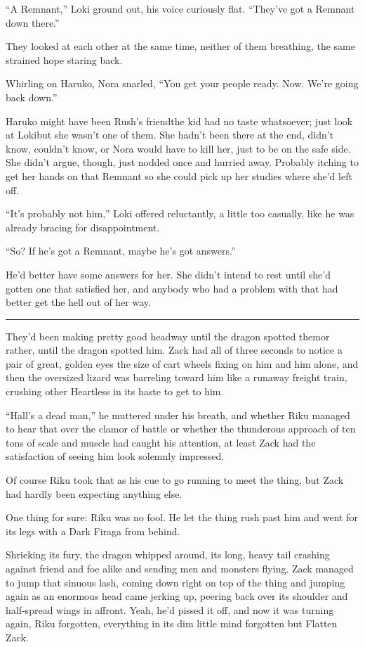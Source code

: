 ``A Remnant,'' Loki ground out, his voice curiously flat. ``They've got a Remnant down there.''

They looked at each other at the same time, neither of them breathing, the same strained hope staring back.

Whirling on Haruko, Nora snarled, ``You get your people ready. Now. We're going back down.''

Haruko might have been Rush's friend\textemdash the kid had no taste whatsoever; just look at Loki\textemdash but she wasn't one of them. She hadn't been there at the end, didn't know, couldn't know, or Nora would have to kill her, just to be on the safe side. She didn't argue, though, just nodded once and hurried away. Probably itching to get her hands on that Remnant so she could pick up her studies where she'd left off.

``It's probably not him,'' Loki offered reluctantly, a little too casually, like he was already bracing for disappointment.

``So? If he's got a Remnant, maybe he's got answers.''

He'd better have some answers for her. She didn't intend to rest until she'd gotten one that satisfied her, and anybody who had a problem with that had better get the hell out of her way.

\fancybreak{\pfbreakdisplay}


They'd been making pretty good headway until the dragon spotted them\textemdash or rather, until the dragon spotted him. Zack had all of three seconds to notice a pair of great, golden eyes the size of cart wheels fixing on him and him alone, and then the oversized lizard was barreling toward him like a runaway freight train, crushing other Heartless in its haste to get to him.

``Hall's a dead man,'' he muttered under his breath, and whether Riku managed to hear that over the clamor of battle or whether the thunderous approach of ten tons of scale and muscle had caught his attention, at least Zack had the satisfaction of seeing him look solemnly impressed.

Of course Riku took that as his cue to go running to meet the thing, but Zack had hardly been expecting anything else.

One thing for sure: Riku was no fool. He let the thing rush past him and went for its legs with a Dark Firaga from behind.

Shrieking its fury, the dragon whipped around, its long, heavy tail crashing against friend and foe alike and sending men and monsters flying. Zack managed to jump that sinuous lash, coming down right on top of the thing and jumping again as an enormous head came jerking up, peering back over its shoulder and half-spread wings in affront. Yeah, he'd pissed it off, and now it was turning again, Riku forgotten, everything in its dim little mind forgotten but Flatten Zack.

